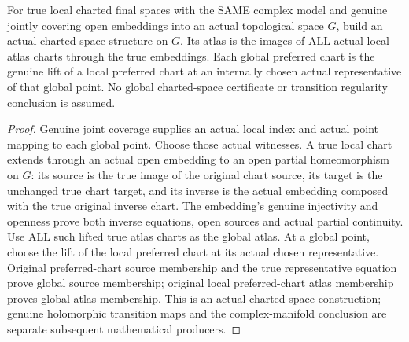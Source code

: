 \begin{definition}
\label{hir:terminal-atlas-actual-lifted-charted-space}
\leanok
{}
For true local charted final spaces with the SAME complex model and genuine
jointly covering open embeddings into an actual topological space $G$, build
an actual charted-space structure on $G$. Its atlas is the images of ALL
actual local atlas charts through the true embeddings. Each global preferred
chart is the genuine lift of a local preferred chart at an internally chosen
actual representative of that global point. No global charted-space certificate
or transition regularity conclusion is assumed.
\end{definition}
\begin{proof}
Genuine joint coverage supplies an actual local index and actual point
mapping to each global point. Choose those actual witnesses. A true local
chart extends through an actual open embedding to an open partial
homeomorphism on $G$: its source is the true image of the original chart
source, its target is the unchanged true chart target, and its inverse is
the actual embedding composed with the true original inverse chart. The
embedding's genuine injectivity and openness prove both inverse equations,
open sources and actual partial continuity. Use ALL such lifted true atlas
charts as the global atlas. At a global point, choose the lift of the local
preferred chart at its actual chosen representative. Original preferred-chart
source membership and the true representative equation prove global source
membership; original local preferred-chart atlas membership proves global
atlas membership. This is an actual charted-space construction; genuine
holomorphic transition maps and the complex-manifold conclusion are separate
subsequent mathematical producers.
\end{proof}
